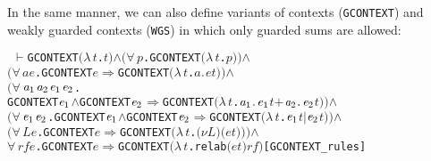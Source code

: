 \documentclass[GCNS]{yincog}
\renewcommand{\HOLinline}[1]{\mbox{\textup{\texttt{#1}}}}
\renewcommand{\HOLConst}[1]{\texttt{#1}}
\renewcommand{\HOLBoundVar}[1]{\ensuremath{\mathit{#1}}}
\renewcommand{\HOLSymConst}[1]{#1}
\renewcommand{\HOLTokenConj}{\ensuremath{\wedge}}
\renewcommand{\HOLTokenForall}{\ensuremath{\forall \,}}
\renewcommand{\HOLTokenLambda}{\ensuremath{\lambda \,}}
\renewcommand{\HOLTokenTurnstile}{\ensuremath{\:\:\vdash}}
\theoremstyle{remark}
\theoremstyle{theorem}
\theoremstyle{remark}
\renewcommand{\HOLTokenImp}{\ensuremath{\Longrightarrow}}
\begin{document}
In the same manner, we can also define variants of contexts (\HOLinline{\HOLConst{GCONTEXT}})
and weakly guarded contexts (\HOLinline{\HOLConst{WGS}}) in which only
guarded sums are allowed:
%
\begin{alltt}
\HOLTokenTurnstile{} \HOLConst{GCONTEXT} \ensuremath{(}\HOLTokenLambda{}\HOLBoundVar{t}. \HOLBoundVar{t}\ensuremath{)} \HOLSymConst{\HOLTokenConj{}} \ensuremath{(}\HOLSymConst{\HOLTokenForall{}}\HOLBoundVar{p}. \HOLConst{GCONTEXT} \ensuremath{(}\HOLTokenLambda{}\HOLBoundVar{t}. \HOLBoundVar{p}\ensuremath{)}\ensuremath{)} \HOLSymConst{\HOLTokenConj{}}
   \ensuremath{(}\HOLSymConst{\HOLTokenForall{}}\HOLBoundVar{a} \HOLBoundVar{e}. \HOLConst{GCONTEXT} \HOLBoundVar{e} \HOLSymConst{\HOLTokenImp{}} \HOLConst{GCONTEXT} \ensuremath{(}\HOLTokenLambda{}\HOLBoundVar{t}. \HOLBoundVar{a}\HOLSymConst{\ensuremath{\ldotp}}\HOLBoundVar{e} \HOLBoundVar{t}\ensuremath{)}\ensuremath{)} \HOLSymConst{\HOLTokenConj{}}
   \ensuremath{(}\HOLSymConst{\HOLTokenForall{}}\ensuremath{\HOLBoundVar{a}\sb{\mathrm{1}}} \ensuremath{\HOLBoundVar{a}\sb{\mathrm{2}}} \ensuremath{\HOLBoundVar{e}\sb{\mathrm{1}}} \ensuremath{\HOLBoundVar{e}\sb{\mathrm{2}}}.
        \HOLConst{GCONTEXT} \ensuremath{\HOLBoundVar{e}\sb{\mathrm{1}}} \HOLSymConst{\HOLTokenConj{}} \HOLConst{GCONTEXT} \ensuremath{\HOLBoundVar{e}\sb{\mathrm{2}}} \HOLSymConst{\HOLTokenImp{}} \HOLConst{GCONTEXT} \ensuremath{(}\HOLTokenLambda{}\HOLBoundVar{t}. \ensuremath{\HOLBoundVar{a}\sb{\mathrm{1}}}\HOLSymConst{\ensuremath{\ldotp}}\ensuremath{\HOLBoundVar{e}\sb{\mathrm{1}}} \HOLBoundVar{t} \HOLSymConst{\ensuremath{+}} \ensuremath{\HOLBoundVar{a}\sb{\mathrm{2}}}\HOLSymConst{\ensuremath{\ldotp}}\ensuremath{\HOLBoundVar{e}\sb{\mathrm{2}}} \HOLBoundVar{t}\ensuremath{)}\ensuremath{)} \HOLSymConst{\HOLTokenConj{}}
   \ensuremath{(}\HOLSymConst{\HOLTokenForall{}}\ensuremath{\HOLBoundVar{e}\sb{\mathrm{1}}} \ensuremath{\HOLBoundVar{e}\sb{\mathrm{2}}}. \HOLConst{GCONTEXT} \ensuremath{\HOLBoundVar{e}\sb{\mathrm{1}}} \HOLSymConst{\HOLTokenConj{}} \HOLConst{GCONTEXT} \ensuremath{\HOLBoundVar{e}\sb{\mathrm{2}}} \HOLSymConst{\HOLTokenImp{}} \HOLConst{GCONTEXT} \ensuremath{(}\HOLTokenLambda{}\HOLBoundVar{t}. \ensuremath{\HOLBoundVar{e}\sb{\mathrm{1}}} \HOLBoundVar{t} \HOLSymConst{\ensuremath{\mid}} \ensuremath{\HOLBoundVar{e}\sb{\mathrm{2}}} \HOLBoundVar{t}\ensuremath{)}\ensuremath{)} \HOLSymConst{\HOLTokenConj{}}
   \ensuremath{(}\HOLSymConst{\HOLTokenForall{}}\HOLBoundVar{L} \HOLBoundVar{e}. \HOLConst{GCONTEXT} \HOLBoundVar{e} \HOLSymConst{\HOLTokenImp{}} \HOLConst{GCONTEXT} \ensuremath{(}\HOLTokenLambda{}\HOLBoundVar{t}. \ensuremath{(\nu}\HOLBoundVar{L}\ensuremath{)} \ensuremath{(}\HOLBoundVar{e} \HOLBoundVar{t}\ensuremath{)}\ensuremath{)}\ensuremath{)} \HOLSymConst{\HOLTokenConj{}}
   \HOLSymConst{\HOLTokenForall{}}\HOLBoundVar{rf} \HOLBoundVar{e}. \HOLConst{GCONTEXT} \HOLBoundVar{e} \HOLSymConst{\HOLTokenImp{}} \HOLConst{GCONTEXT} \ensuremath{(}\HOLTokenLambda{}\HOLBoundVar{t}. \HOLConst{relab} \ensuremath{(}\HOLBoundVar{e} \HOLBoundVar{t}\ensuremath{)} \HOLBoundVar{rf}\ensuremath{)}\hfill{[GCONTEXT\_rules]}
\end{alltt}
\end{document}
